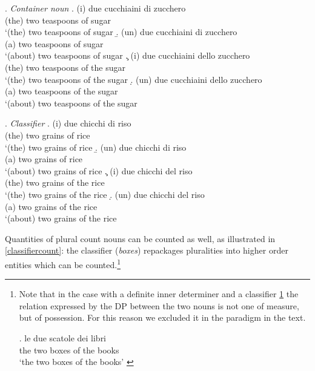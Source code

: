 \documentclass[charis, linguex]{glossa}
\begin{document}
\ex. \textit{Container noun} \label{container}
	\a.  \gll (i) due cucchiaini  di zucchero \\ 
      (the) two teaspoons  of sugar  \\ 
	  \glt  `(the) two teaspoons of sugar    \label{container-a}
  	\b.  \gll (un) due cucchiaini di zucchero \\ 
        (a) two teaspoons  of sugar  \\ 
  	  \glt  `(about) two teaspoons of sugar    \label{container-b}
  	\c.  \gll (i) due cucchiaini dello zucchero \\ 
        (the) two teaspoons  {of the} sugar  \\ 
  	  \glt  `(the) two teaspoons of the sugar    \label{container-c}
  	\d.  \gll (un) due cucchiaini  dello zucchero \\ 
        (a) two teaspoons {of the} sugar  \\ 
  	  \glt  `(about) two teaspoons {of the} sugar  \label{container-d}
	  
\ex. \textit{Classifier}  \label{classifier}
	\a. \gll (i) due chicchi  di riso \\ 
      (the) two grains of rice  \\ 
	  \glt  `(the) two grains of rice   \label{classifier-a}
  	\b. \gll (un) due chicchi  di riso \\ 
        (a) two grains of rice  \\ 
  	  \glt  `(about) two grains of rice   \label{classifier-b}
  	\c. \gll (i) due chicchi  del riso \\ 
        (the) two grains {of the} rice  \\ 
  	  \glt  `(the) two grains of the rice   \label{classifier-c}
  	\d. \gll (un) due chicchi  del riso \\ 
        (a) two grains  {of the} rice  \\ 
  	  \glt  `(about) two grains of the rice   \label{classifier-d}

Quantities of plural count nouns can be counted as well, as illustrated in \ref{classifiercount}: the classifier (\textit{boxes}) repackages pluralities into higher order entities which can be counted.\footnote{Note that in the case with a definite inner determiner and a classifier \ref{books} the relation expressed by the DP between the two nouns  is not one of measure, but of possession. For this reason we excluded it in the paradigm in the text.

\exg. le due scatole dei libri \\
the two boxes {of the} books \\ 
\glt  `the two boxes of the books' \label{books}


}
\end{document}
